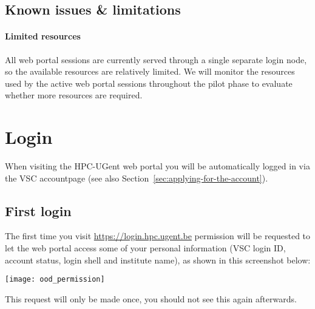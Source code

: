 


\subsection{Known issues \& limitations}

\paragraph{Limited resources}

All web portal sessions are currently served through a single separate login node,
so the available resources are relatively limited.
We will monitor the resources used by the active web portal sessions throughout the pilot
phase to evaluate whether more resources are required.

\section{Login}

When visiting the HPC-UGent web portal you will be automatically logged in via the VSC accountpage
(see also Section~\ref{sec:applying-for-the-account}).

\subsection{First login}

The first time you visit \url{https://login.hpc.ugent.be} permission will be requested to let the web portal 
access some of your personal information (VSC login ID, account status, login shell and institute name),
as shown in this screenshot below:

\begin{center}
    \texttt{[image: ood\_permission]}
\end{center}


This request will only be made once, you should not see this again afterwards.

